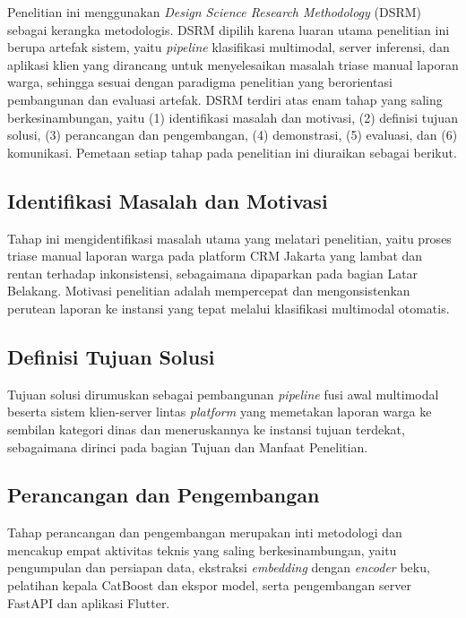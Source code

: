 Penelitian ini menggunakan \textit{Design Science Research Methodology} (DSRM) \citep{peffersDSRM2007} sebagai kerangka metodologis. DSRM dipilih karena luaran utama penelitian ini berupa artefak sistem, yaitu \textit{pipeline} klasifikasi multimodal, server inferensi, dan aplikasi klien yang dirancang untuk menyelesaikan masalah triase manual laporan warga, sehingga sesuai dengan paradigma penelitian yang berorientasi pembangunan dan evaluasi artefak. DSRM terdiri atas enam tahap yang saling berkesinambungan, yaitu (1) identifikasi masalah dan motivasi, (2) definisi tujuan solusi, (3) perancangan dan pengembangan, (4) demonstrasi, (5) evaluasi, dan (6) komunikasi. Pemetaan setiap tahap pada penelitian ini diuraikan sebagai berikut.

\subsection{Identifikasi Masalah dan Motivasi}

Tahap ini mengidentifikasi masalah utama yang melatari penelitian, yaitu proses triase manual laporan warga pada platform CRM Jakarta yang lambat dan rentan terhadap inkonsistensi, sebagaimana dipaparkan pada bagian Latar Belakang. Motivasi penelitian adalah mempercepat dan mengonsistenkan perutean laporan ke instansi yang tepat melalui klasifikasi multimodal otomatis.

\subsection{Definisi Tujuan Solusi}

Tujuan solusi dirumuskan sebagai pembangunan \textit{pipeline} fusi awal multimodal beserta sistem klien-server lintas \textit{platform} yang memetakan laporan warga ke sembilan kategori dinas dan meneruskannya ke instansi tujuan terdekat, sebagaimana dirinci pada bagian Tujuan dan Manfaat Penelitian.

\subsection{Perancangan dan Pengembangan}

Tahap perancangan dan pengembangan merupakan inti metodologi dan mencakup empat aktivitas teknis yang saling berkesinambungan, yaitu pengumpulan dan persiapan data, ekstraksi \textit{embedding} dengan \textit{encoder} beku, pelatihan kepala CatBoost dan ekspor model, serta pengembangan server FastAPI dan aplikasi Flutter.

